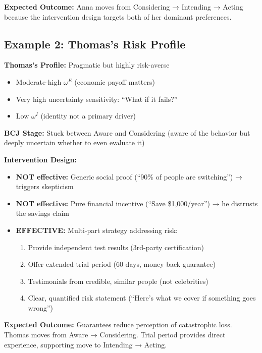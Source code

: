 \textbf{Expected Outcome:} Anna moves from Considering → Intending → Acting because
the intervention design targets both of her dominant preferences.

\subsection{Example 2: Thomas's Risk Profile}

\textbf{Thomas's Profile:} Pragmatic but highly risk-averse

\begin{itemize}
    \item Moderate-high $\omega^E$ (economic payoff matters)
    \item Very high uncertainty sensitivity: ``What if it fails?''
    \item Low $\omega^I$ (identity not a primary driver)
\end{itemize}

\textbf{BCJ Stage:} Stuck between Aware and Considering (aware of the behavior but
deeply uncertain whether to even evaluate it)

\textbf{Intervention Design:}
\begin{itemize}
    \item \textbf{NOT effective:} Generic social proof (``90\% of people are switching'')
    → triggers skepticism
    \item \textbf{NOT effective:} Pure financial incentive (``Save \$1,000/year'') →
    he distrusts the savings claim
    \item \textbf{EFFECTIVE:} Multi-part strategy addressing risk:
    \begin{enumerate}
        \item Provide independent test results (3rd-party certification)
        \item Offer extended trial period (60 days, money-back guarantee)
        \item Testimonials from credible, similar people (not celebrities)
        \item Clear, quantified risk statement (``Here's what we cover if something goes wrong'')
    \end{enumerate}
\end{itemize}

\textbf{Expected Outcome:} Guarantees reduce perception of catastrophic loss. Thomas
moves from Aware → Considering. Trial period provides direct experience, supporting
move to Intending → Acting.

